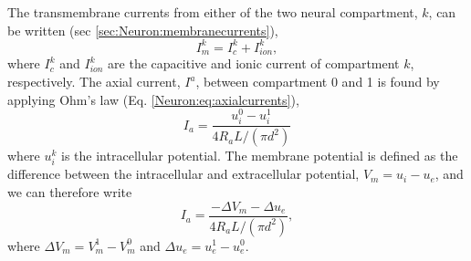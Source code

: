 The transmembrane currents from either of the two neural compartment, $k$, can be written (sec \ref{sec:Neuron:membranecurrents}),
\begin{equation}
I_m^k = I^k_c + I^k_{ion},
\end{equation}
where $I_c^k$ and $I_{ion}^k$ are the capacitive and ionic current of compartment $k$, respectively.
The axial current, $I^a$, between compartment 0 and 1 is found by applying Ohm's law (Eq. \ref{Neuron:eq:axialcurrents}),
\begin{equation}
I_a = \frac{u_i^0 - u_i^1}{4 R_a L / (\pi d^2)}
\end{equation}
where $u_i^k$ is the intracellular potential. The membrane potential is defined as the difference between the intracellular and extracellular potential, $V_m = u_i - u_e$, and we can therefore write
\begin{equation}
I_a = \frac{-\Delta V_m - \Delta u_e}{4 R_a L / (\pi d^2)},
\end{equation}
where $\Delta V_m = V_m^1 - V_m^0$ and $\Delta u_e = u_e^1 - u_e^0$.
 
